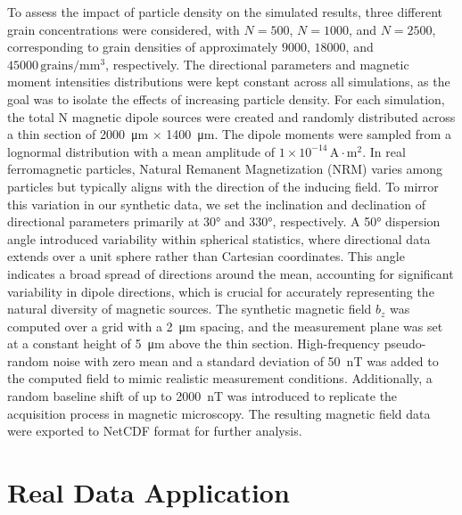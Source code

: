 To assess the impact of particle density on the simulated results, three different grain concentrations were considered, with \(N=500\), \(N=1000\), and \(N=2500\), corresponding to grain densities of approximately \(9000\), \(18000\), and \(45000\,\mathrm{grains/mm^3}\), respectively. The directional parameters and magnetic moment intensities distributions were kept constant across all simulations, as the goal was to isolate the effects of increasing particle density. For each simulation, the total N magnetic dipole sources were created and randomly distributed across a thin section of \qty{2000}{\um} \(\times\) \qty{1400}{\um}. The dipole moments were sampled from a lognormal distribution with a mean amplitude of \(1 \times 10^{-14}\,\mathrm{A \cdot m^2}\). In real ferromagnetic particles, Natural Remanent Magnetization (NRM) varies among particles but typically aligns with the direction of the inducing field. To mirror this variation in our synthetic data, we set the inclination and declination of directional parameters primarily at 30° and 330°, respectively. A 50° dispersion angle introduced variability within spherical statistics, where directional data extends over a unit sphere rather than Cartesian coordinates. This angle indicates a broad spread of directions around the mean, accounting for significant variability in dipole directions, which is crucial for accurately representing the natural diversity of magnetic sources. The synthetic magnetic field \(b_z\) was computed over a grid with a \qty{2}{\um} spacing, and the measurement plane was set at a constant height of \qty{5}{\um} above the thin section. High-frequency pseudo-random noise with zero mean and a standard deviation of \qty{50}{\nano\tesla} was added to the computed field to mimic realistic measurement conditions. Additionally, a random baseline shift of up to \qty{2000}{\nano\tesla} was introduced to replicate the acquisition process in magnetic microscopy. The resulting magnetic field data were exported to NetCDF format for further analysis.



\section{Real Data Application}

